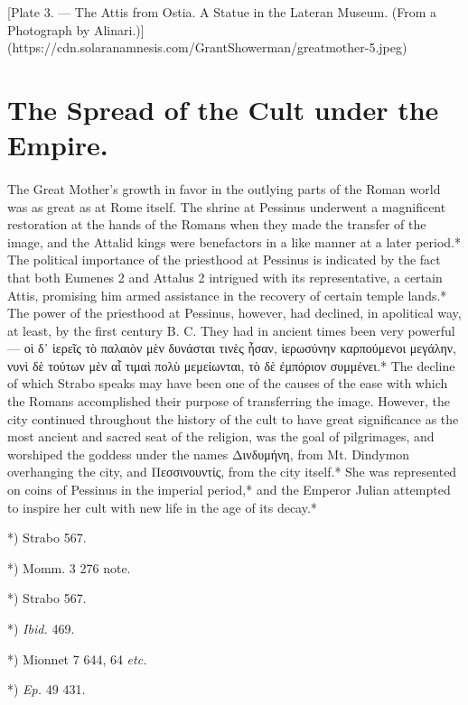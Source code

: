 \documentclass[a4paper, 11pt, oneside, polutonikogreek, english]{article}
\begin{document}
[Plate 3. --- The Attis from Ostia. A Statue in the Lateran Museum. (From a Photograph by Alinari.)](https://cdn.solaranamnesis.com/GrantShowerman/greatmother-5.jpeg)

\section{The Spread of the Cult under the Empire.}
\paragraph{}
The Great Mother's growth in favor in the outlying parts of the Roman world was as great as at Rome itself. The shrine at Pessinus underwent a magnificent restoration at the hands of the Romans when they made the transfer of the image, and the Attalid kings were benefactors in a like manner at a later period.* The political importance of the priesthood at Pessinus is indicated by the fact that both Eumenes 2 and Attalus 2 intrigued with its representative, a certain Attis, promising him armed assistance in the recovery of certain temple lands.* The power of the priesthood at Pessinus, however, had declined, in apolitical way, at least, by the first century B. C. They had in ancient times been very powerful --- οὶ δ᾽ ἱερεῖς τὸ παλαιὸν μὲν δυνάσται τινὲς ἦσαν, ἱερωσύνην καρπούμενοι μεγάλην, νυνὶ δὲ τούτων μὲν αἷ τιμαὶ πολὺ μεμείωνται, τὸ δὲ ἐμπόριον συμμένει.* The decline of which Strabo speaks may have been one of the causes of the ease with which the Romans accomplished their purpose of transferring the image. However, the city continued throughout the history of the cult to have great significance as the most ancient and sacred seat of the religion, was the goal of pilgrimages, and worshiped the goddess under the names Δινδυμήνη, from Mt. Dindymon overhanging the city, and Πεσσινουντίς, from the city itself.* She was represented on coins of Pessinus in the imperial period,* and the Emperor Julian attempted to inspire her cult with new life in the age of its decay.*

*) Strabo 567.

*) Momm. 3 276 note.

*) Strabo 567.

*) \emph{Ibid.} 469.

*) Mionnet 7 644, 64 \emph{etc.}

*) \emph{Ep.} 49 431.
\end{document}
